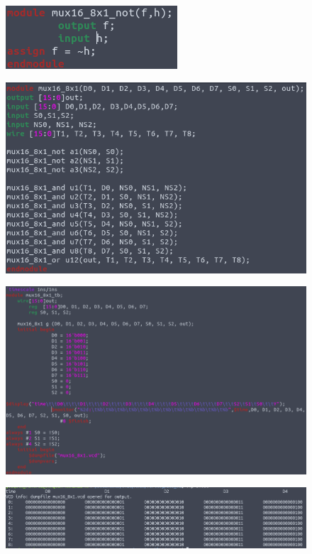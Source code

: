 \documentclass[11pt,a4paper]{article}
\begin{document}
\begin{enumerate}
\begin{enumerate}[label=(\alph*)]
\begin{figure}[h!]
\centering
\includegraphics[scale=0.7]{16_8x1MUX_3.png} 
\end{figure}
\begin{figure}[h!]
\centering
\includegraphics[scale=0.4]{16_8x1MUX_4.png} 
\end{figure}
\begin{figure}[h!]
\centering
\includegraphics[scale=0.35]{16_8x1MUX_5.png} 
\end{figure}
\begin{figure}[h!]
\centering
\includegraphics[scale=0.5]{16_8x1MUX_61.png} 

\end{figure}
\end{enumerate}
\end{enumerate}
\end{document}
